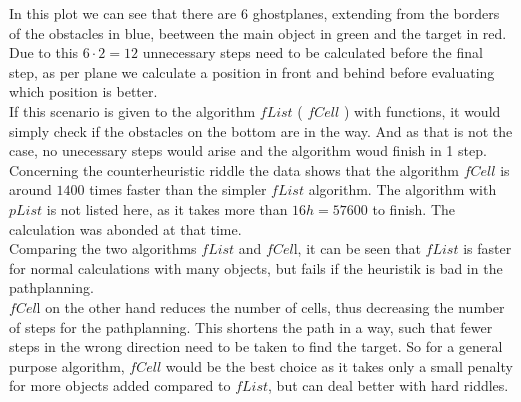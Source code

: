 In this plot we can see that there are 6 ghostplanes, extending from the borders of the obstacles in blue, beetween the main object in green and the target in red. Due to this $6\cdot2 = 12$ unnecessary steps need to be calculated before the final step, as per plane we calculate a position in front and behind before evaluating which position is better.\\
If this scenario is given to the algorithm $fList$ ( $fCell$ ) with functions, it would simply check if the obstacles on the bottom are in the way. And as that is not the case, no unecessary steps would arise and the algorithm woud finish in 1 step.\\
\newline
Concerning the counterheuristic riddle the data shows that the algorithm $fCell$ is around $1400$ times faster than the simpler $fList$ algorithm. The algorithm with $pList$ is not listed here, as it takes more than $16h = 57600$ to finish. The calculation was abonded at that time.\\
Comparing the two algorithms $fList$ and $fCel$l, it can be seen that $fList$ is faster for normal calculations with many objects, but fails if the heuristik is bad in the pathplanning. \\
$fCel$l on the other hand reduces the number of cells, thus decreasing the number of steps for the pathplanning. This shortens the path in a way, such that fewer steps in the wrong direction need to be taken to find the target. So for a general purpose algorithm, $fCell$ would be the best choice as it takes only a small penalty for more objects added compared to $fList$, but can deal better with hard riddles.